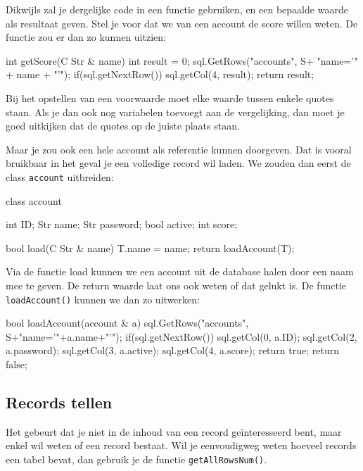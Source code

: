 Dikwijls zal je dergelijke code in een functie gebruiken, en een bepaalde waarde als resultaat geven. Stel je voor dat we van een account de score willen weten. De functie zou er dan zo kunnen uitzien:

\begin{code}
int getScore(C Str & name) {
  int result = 0;
	sql.GetRows("accounts", S+ "name='" + name + "'");
	if(sql.getNextRow()) {
	  sql.getCol(4, result);
	}
	return result;
}
\end{code}

\begin{note}
Bij het opstellen van een voorwaarde moet elke waarde tussen enkele quotes staan. Als je dan ook nog variabelen toevoegt aan de vergelijking, dan moet je goed uitkijken dat de quotes op de juiste plaats staan.
\end{note}

Maar je zou ook een hele account als referentie kunnen doorgeven. Dat is vooral bruikbaar in het geval je een volledige record wil laden. We zouden dan eerst de class \texttt{account} uitbreiden:

\begin{code}
class account {
	int ID;
	Str name;
	Str password;
	bool active;
	int score;
	
	bool load(C Str & name) {
		T.name = name;
	  return loadAccount(T);
	}
}
\end{code}
Via de functie load kunnen we een account uit de database halen door een naam mee te geven. De return waarde laat ons ook weten of dat gelukt is. De functie \texttt{loadAccount()} kunnen we dan zo uitwerken:

\begin{code}
bool loadAccount(account & a) {
  sql.GetRows("accounts", S+"name='"+a.name+"'");
	if(sql.getNextRow()) {
		sql.getCol(0, a.ID);
		sql.getCol(2, a.password);
		sql.getCol(3, a.active);
		sql.getCol(4, a.score);
		return true;
  }
	return false;
}
\end{code}

\subsection{Records tellen}
Het gebeurt dat je niet in de inhoud van een record ge\"interesseerd bent, maar enkel wil weten of een record bestaat. Wil je eenvoudigweg weten hoeveel records een tabel bevat, dan gebruik je de functie \texttt{getAllRowsNum()}.

\begin{code} {
int accountsInDB() {
  return sql.getAllRowsNum("accounts");
}
\end{code}

